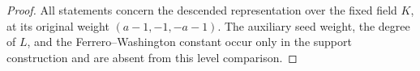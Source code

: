 \begin{proof}
All statements concern the descended representation over
the fixed field \(K\), at its original weight
\((a-1,-1,-a-1)\).
The auxiliary seed weight, the degree of \(L\), and the
Ferrero--Washington constant occur only in the support
construction and are absent from this level comparison.
\end{proof}

